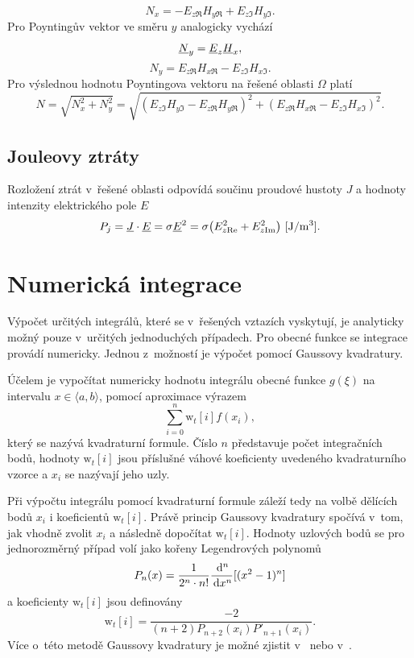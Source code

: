 \begin{displaymath}
	N_x = - E_{z\Re} H_{y\Re} + E_{z\Im} H_{y\Im}.
\end{displaymath}
Pro Poyntingův vektor ve směru $y$ analogicky vychází
\begin{displaymath}
	{\underline{N}}_y = {\underline{E}}_z {\underline{H}}_x,
\end{displaymath}
\begin{displaymath}
	N_y = E_{z\Re} H_{x\Re} - E_{z\Im} H_{x\Im}.
\end{displaymath}
Pro výslednou hodnotu Poyntingova vektoru na řešené oblasti $\Omega$ platí
\begin{displaymath}
	N = \sqrt{N_{x}^{2} + N_{y}^{2}} = \sqrt{(E_{z\Im} H_{y\Im} - E_{z\Re} H_{y\Re})^{2} + (E_{z\Re} H_{x\Re} - E_{z\Im} H_{x\Im})^{2}}.
\end{displaymath}

\subsection*{Jouleovy ztráty}
Rozložení ztrát v~řešené oblasti odpovídá součinu proudové hustoty $J$ a hodnoty intenzity elektrického pole $E$ 
\begin{displaymath}
	P_j = {\underline{J}} \cdot {\underline{E}} = \sigma {\underline{E}}^{2} = \sigma \big(E_{z\mathrm{Re}}^{2} + E_{z\mathrm{Im}}^{2}\big)\mathrm{\ [J/m^{3}]}.
\end{displaymath}

\section{Numerická integrace}
Výpočet určitých integrálů, které se v~řešených vztazích vyskytují, je analyticky možný pouze v~určitých jednoduchých případech. Pro obecné funkce se integrace provádí numericky. Jednou z~možností je výpočet pomocí Gaussovy kvadratury.

Účelem je vypočítat numericky hodnotu integrálu obecné funkce $g(\xi)$ na intervalu $x\in\langle a, b\rangle$,  pomocí aproximace výrazem
\begin{displaymath}
\sum_{i=0}^{n}\mathrm{w}_{t}[i]f(x_{i}),
\end{displaymath}
který se nazývá kvadraturní formule. Číslo $n$ představuje počet integračních bodů, hodnoty $\mathrm{w}_{t}[i]$ jsou příslušné váhové koeficienty uvedeného kvadraturního vzorce a $x_{i}$ se nazývají jeho uzly. 

Při výpočtu integrálu pomocí kvadraturní formule záleží tedy na volbě dělících bodů $x_{i}$ i koeficientů $\mathrm{w}_{t}[i]$. Právě princip Gaussovy kvadratury spočívá v~tom, jak vhodně zvolit $x_{i}$ a následně dopočítat $\mathrm{w}_{t}[i]$. Hodnoty uzlových bodů se pro jednorozměrný případ volí jako kořeny Legendrových polynomů
\begin{displaymath}
	P_{n}(x) = \frac{1}{2^{n}\cdot n!}\frac{\,\mathrm{d}^{n}}{\,\mathrm{d} x^{n}}[(x^{2} - 1)^{n}]
\end{displaymath}
a koeficienty $\mathrm{w}_{t}[i]$ jsou definovány
\begin{displaymath}
\mathrm{w}_{t}[i] = \frac{-2}{(n+2)P_{n+2}(x_i)P'_{n+1}(x_i)}.
\end{displaymath}
Více o~této metodě Gaussovy kvadratury je možné zjistit v~\cite{gk_tichy} nebo v~\cite{gk_kaw}.

